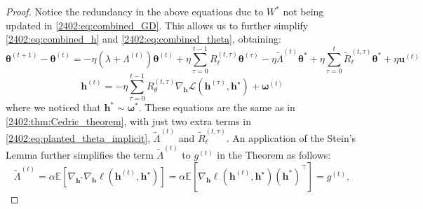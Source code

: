 \begin{proof}
    Notice the redundancy in the above equations due to $W^*$ not being updated in \eqref{2402:eq:combined_GD}. This allows us to further simplify \eqref{2402:eq:combined_h} and \eqref{2402:eq:combined_theta}, obtaining:
    \begin{equation} \label{2402:eq:planted_theta_implicit}
        \boldsymbol{\theta}^{(t+1)} -  \boldsymbol{\theta}^{(t)}= -  \eta \left(\lambda + \Lambda^{(t)}\right)\boldsymbol{\theta}^{(t)} + \eta \sum_{\tau=0}^{t-1}  R_\ell^{(t,\tau)}\boldsymbol{\theta}^{(\tau)} -  \eta \tilde\Lambda^{(t)}\boldsymbol{\theta}^* + \eta \sum_{\tau=0}^{t}  \tilde R_\ell^{(t,\tau)}\boldsymbol{\theta}^* +  \eta \boldsymbol{u}^{(t)}
    \end{equation}
    \begin{equation}
        \boldsymbol{h}^{(t)} = -\eta\sum_{\tau=0}^{t-1}R_\theta^{(t,\tau)} \nabla_{\boldsymbol{h}} \mathcal{L}(\boldsymbol{h}^{(\tau)}, \boldsymbol{h}^\star) + \boldsymbol{\omega}^{(t)}
    \end{equation}
    where we noticed that $\boldsymbol{h}^* \sim \boldsymbol{\omega}^*$. 
    These equations are the same as in \ref{2402:thm:Cedric_theorem}, with just two extra terms in \eqref{2402:eq:planted_theta_implicit}, $
    \tilde\Lambda^{(t)}$ and $\tilde R_\ell^{(t,\tau)}$. 
   An application of the Stein's Lemma further simplifies the term $\tilde\Lambda^{(t)}$ to $g^{(t)}$ in the Theorem as follows:
    \begin{equation}
        \tilde\Lambda^{(t)} = \alpha\mathbb{E}\left[ \nabla_{\boldsymbol{h}^*}\nabla_{\boldsymbol{h}} \ell(\boldsymbol{h}^{(t)}, \boldsymbol{h}^\star)\right] = \alpha \mathbb{E}\left[ \nabla_{\boldsymbol{h}} \ell(\boldsymbol{h}^{(t)}, \boldsymbol{h}^\star) \left( \boldsymbol{h}^* \right)^\top\right] = g^{(t)}, 
    \end{equation}

    


\end{proof}
